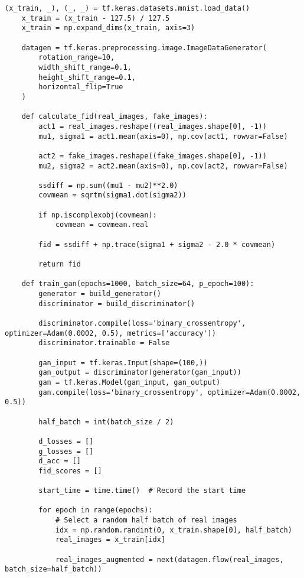 \begin{lstlisting}[style=mypython, caption= { Explore Data Augmentaion (rotation 10, width and height shift 0.1 \\ and  horizontal flip)}, captionpos=t]
    (x_train, _), (_, _) = tf.keras.datasets.mnist.load_data()
    x_train = (x_train - 127.5) / 127.5
    x_train = np.expand_dims(x_train, axis=3)
    
    datagen = tf.keras.preprocessing.image.ImageDataGenerator(
        rotation_range=10,
        width_shift_range=0.1,
        height_shift_range=0.1,
        horizontal_flip=True
    )
    
    def calculate_fid(real_images, fake_images):
        act1 = real_images.reshape((real_images.shape[0], -1))
        mu1, sigma1 = act1.mean(axis=0), np.cov(act1, rowvar=False)
        
        act2 = fake_images.reshape((fake_images.shape[0], -1))
        mu2, sigma2 = act2.mean(axis=0), np.cov(act2, rowvar=False)
        
        ssdiff = np.sum((mu1 - mu2)**2.0)
        covmean = sqrtm(sigma1.dot(sigma2))
        
        if np.iscomplexobj(covmean):
            covmean = covmean.real
        
        fid = ssdiff + np.trace(sigma1 + sigma2 - 2.0 * covmean)
        
        return fid
    
    def train_gan(epochs=1000, batch_size=64, p_epoch=100):
        generator = build_generator()
        discriminator = build_discriminator()
    
        discriminator.compile(loss='binary_crossentropy', optimizer=Adam(0.0002, 0.5), metrics=['accuracy'])
        discriminator.trainable = False
    
        gan_input = tf.keras.Input(shape=(100,))
        gan_output = discriminator(generator(gan_input))
        gan = tf.keras.Model(gan_input, gan_output)
        gan.compile(loss='binary_crossentropy', optimizer=Adam(0.0002, 0.5))
    
        half_batch = int(batch_size / 2)
        
        d_losses = []
        g_losses = []
        d_acc = []
        fid_scores = []
        
        start_time = time.time()  # Record the start time
    
        for epoch in range(epochs):
            # Select a random half batch of real images
            idx = np.random.randint(0, x_train.shape[0], half_batch)
            real_images = x_train[idx]
    
            real_images_augmented = next(datagen.flow(real_images, batch_size=half_batch))
    

\end{lstlisting}
